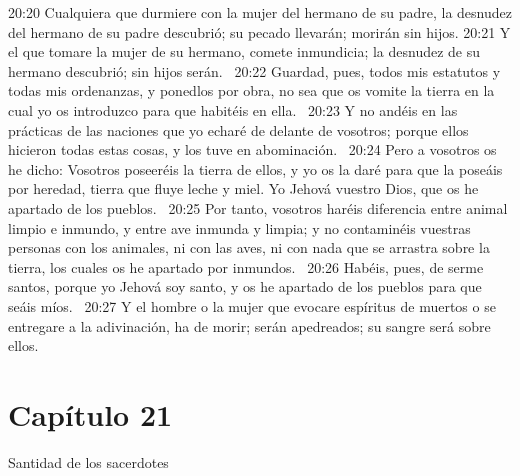 20:20 Cualquiera que durmiere con la mujer del hermano de su padre, la desnudez del hermano de su padre descubrió; su pecado llevarán; morirán sin hijos. 
20:21 Y el que tomare la mujer de su hermano, comete inmundicia; la desnudez de su hermano descubrió; sin hijos serán.  
20:22 Guardad, pues, todos mis estatutos y todas mis ordenanzas, y ponedlos por obra, no sea que os vomite la tierra en la cual yo os introduzco para que habitéis en ella.  
20:23 Y no andéis en las prácticas de las naciones que yo echaré de delante de vosotros; porque ellos hicieron todas estas cosas, y los tuve en abominación.  
20:24 Pero a vosotros os he dicho: Vosotros poseeréis la tierra de ellos, y yo os la daré para que la poseáis por heredad, tierra que fluye leche y miel. Yo Jehová vuestro Dios, que os he apartado de los pueblos.  
20:25 Por tanto, vosotros haréis diferencia entre animal limpio e inmundo, y entre ave inmunda y limpia; y no contaminéis vuestras personas con los animales, ni con las aves, ni con nada que se arrastra sobre la tierra, los cuales os he apartado por inmundos.  
20:26 Habéis, pues, de serme santos, porque yo Jehová soy santo, y os he apartado de los pueblos para que seáis míos.  
20:27 Y el hombre o la mujer que evocare espíritus de muertos o se entregare a la adivinación, ha de morir; serán apedreados; su sangre será sobre ellos.  
\section*{Capítulo 21 }
Santidad de los sacerdotes  

